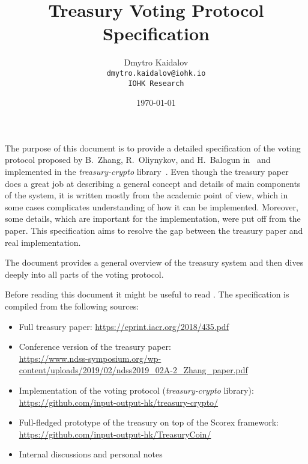 \documentclass{article}
\title{Treasury Voting Protocol Specification}
\author{Dmytro Kaidalov\\
    \texttt{dmytro.kaidalov@iohk.io}\\
    \texttt{IOHK Research}}
\date{\today}
\begin{document}
\maketitle
\thispagestyle{empty}

The purpose of this document is to provide a detailed specification of the voting protocol proposed by B.~Zhang, R.~Oliynykov, and H.~Balogun in~\cite{ZOB18} and implemented in the \textit{treasury-crypto} library~\cite{treasury-crypto}. Even though the treasury paper~\cite{ZOB18} does a great job at describing a general concept and details of main components of the system, it is written mostly from the academic point of view, which in some cases complicates understanding of how it can be implemented. Moreover, some details, which are important for the implementation, were put off from the paper. This specification aims to resolve the gap between the treasury paper and real implementation.

The document provides a general overview of the treasury system and then dives deeply into all parts of the voting protocol.

Before reading this document it might be useful to read \cite{ZOB18}. 
The specification is compiled from the following sources:
\begin{itemize}
    \item Full treasury paper: \url{https://eprint.iacr.org/2018/435.pdf} \cite{ZOB18}
    \item Conference version of the treasury paper:\\ \url{https://www.ndss-symposium.org/wp-content/uploads/2019/02/ndss2019_02A-2_Zhang_paper.pdf} \cite{ZOB18NDSS}
    \item Implementation of the voting protocol (\textit{treasury-crypto} library):\\ \url{https://github.com/input-output-hk/treasury-crypto/} \cite{treasury-crypto}
    \item Full-fledged prototype of the treasury on top of the Scorex framework:\\
    \url{https://github.com/input-output-hk/TreasuryCoin/} \cite{treasurycoin}
    \item Internal discussions and personal notes
\end{itemize}

\newpage
{
  \hypersetup{linkcolor=black}
  \tableofcontents
}





\end{document}
